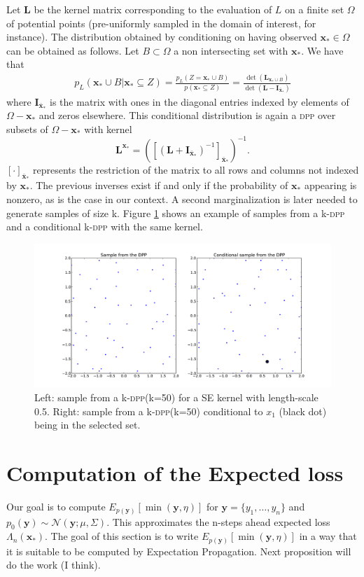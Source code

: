 \documentclass{article} %
\newcommand{\bx}{\textbf{x}}
\newcommand{\by}{\textbf{y}}
\newcommand{\bL}{\textbf{L}}
\newcommand{\bI}{\textbf{I}}
\newcommand{\N}{\mathcal{N}}
\newcommand{\acr}[1]{\textsc{#1}\xspace}
\newcommand{\dpp}{\acr{dpp}}
\begin{document}
Let $\bL$ be the kernel matrix corresponding to the evaluation of $L$ on a finite set $\Omega$ of potential points (pre-uniformly sampled in the domain of interest, for instance).  The distribution obtained by conditioning on having observed $\bx_* \in \Omega$ can be obtained as follows. Let $B \subset \Omega$ a non intersecting set with $\bx_*$. We have that
\begin{eqnarray}
p_L(\bx_* \cup B | \bx_* \subseteq Z ) = \frac{p_L(Z = \bx_* \cup B ) }{p(\bx_* \subseteq Z)} = \frac{\det(\bL_{\bx_* \cup B})}{\det(\bL - \bI_{\bar{\bx}_*} ) }
\end{eqnarray}
where $\bI_{\bar{\bx}_*}$ is the matrix with ones in the diagonal entries indexed by elements of $\Omega - \bx_*$ and zeros elsewhere.  This conditional distribution is again a \dpp over subsets of $\Omega-\bx_*$ \citep{Borodin*Rains*2005} with kernel 
$$\bL^{\bx_*} = \left( [   (\bL + \bI_{\bar{\bx}_*})^{-1}]_{\bar{\bx}_*} \right)^{-1}.$$
$[\cdot ]_{\bar{\bx}_*}$ represents the restriction of the matrix to all rows and columns not indexed by $\bx_*$. The previous inverses exist if and only if the probability of $\bx_*$ appearing is nonzero, as is the case in our context. A second marginalization is later needed to generate samples of size k.  Figure \ref{fig1} shows an example of samples from a k-\dpp and a conditional k-\dpp with the same kernel.
 
\begin{figure}[ht]
    \centering
  \includegraphics[width=.9\textwidth]{conditional_dpp.pdf}
\caption{Left: sample from a k-\dpp (k=50) for a SE kernel with length-scale 0.5. Right: sample from a k-\dpp (k=50) conditional to $x_1$ (black dot) being in the selected set. }
    \label{fig1}
\end{figure}

\newpage
\section{Computation of the Expected loss}
Our goal is to compute $E_{p(\by)} [\min (\by,\eta)]$ for $\by=\{y_1,\dots,y_n\}$ and $p_0(\by) \sim \N(\by; \mu, \Sigma)$. This  approximates the n-steps ahead expected loss $\Lambda_n(\bx_*)$. The goal of this section is to write  $E_{p(\by)} [\min (\by,\eta)]$ in a way that it is suitable to be computed by Expectation Propagation. Next proposition will do the work (I think).
\end{document}
